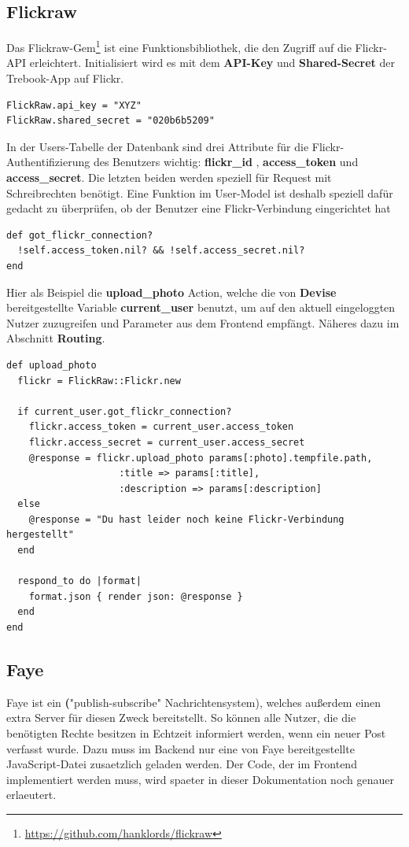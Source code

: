 \documentclass[10pt,a4paper]{book}
\begin{document}
\subsection{Flickraw}
Das Flickraw-Gem\footnote{\href{https://github.com/hanklords/flickraw}{https://github.com/hanklords/flickraw}} ist eine Funktionsbibliothek, 
die den Zugriff auf die Flickr-API erleichtert. Initialisiert wird es mit dem \textbf{API-Key} und \textbf{Shared-Secret} der Trebook-App auf Flickr.
\begin{lstlisting}
FlickRaw.api_key = "XYZ"
FlickRaw.shared_secret = "020b6b5209"
\end{lstlisting}
In der Users-Tabelle der Datenbank sind drei Attribute für die Flickr-Authentifizierung des Benutzers wichtig: \textbf{flickr\_id} , 
\textbf{access\_token} und \textbf{access\_secret}. Die letzten beiden werden speziell für Request mit Schreibrechten benötigt. Eine Funktion im User-Model ist deshalb speziell dafür gedacht zu überprüfen, ob der Benutzer eine Flickr-Verbindung eingerichtet hat
\begin{lstlisting}
def got_flickr_connection?
  !self.access_token.nil? && !self.access_secret.nil?
end
\end{lstlisting}
Hier als Beispiel die \textbf{upload\_photo} Action, welche die von \textbf{Devise} bereitgestellte Variable \textbf{current\_user} benutzt,
um auf den aktuell eingeloggten Nutzer zuzugreifen und Parameter aus dem Frontend empfängt. Näheres dazu im Abschnitt \textbf{Routing}.
\begin{lstlisting}
def upload_photo
  flickr = FlickRaw::Flickr.new

  if current_user.got_flickr_connection?
    flickr.access_token = current_user.access_token
    flickr.access_secret = current_user.access_secret
    @response = flickr.upload_photo params[:photo].tempfile.path, 
    				:title => params[:title], 
    				:description => params[:description]
  else
    @response = "Du hast leider noch keine Flickr-Verbindung hergestellt"
  end

  respond_to do |format|
    format.json { render json: @response }
  end
end
\end{lstlisting}
\subsection{Faye}
Faye ist ein \textbf("publish-subscribe" Nachrichtensystem), welches außerdem einen extra Server für diesen Zweck bereitstellt. So können alle Nutzer, die die benötigten Rechte besitzen in Echtzeit informiert werden, wenn ein neuer Post verfasst wurde. Dazu muss im Backend nur eine von Faye bereitgestellte JavaScript-Datei zusaetzlich geladen werden. Der Code, der im Frontend implementiert werden muss, wird spaeter in dieser Dokumentation noch genauer erlaeutert.
\end{document}
